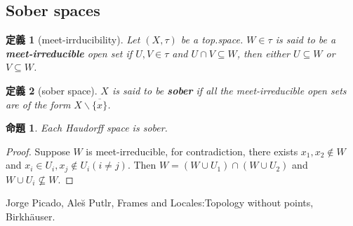 \documentclass[a4j,12pt]{jarticle}
\numberwithin{equation}{section}
\newcommand{\itbf}[1]{\textit{\textbf{#1}}}
\newtheorem{dfn}{定義}[section]
\newtheorem{prop}[thm]{命題}
\begin{document}
\subsection{Sober spaces}
\begin{dfn}[meet-irrducibility]
  Let $(X,\tau)$ be a top.space. $W\in \tau$ is said to be a \itbf{meet-irreducible} open set if $U,V\in \tau$ and $U \cap V \subseteq W$, then either $U \subseteq W$ or $V \subseteq W$.
\end{dfn}
\begin{dfn}[sober space]
  $X$ is said to be \itbf{sober} if all the meet-irreducible open sets are of the form $X\backslash \overline{\{x\}}$.
\end{dfn}
\begin{prop}
  Each Haudorff space is sober.
\end{prop}
\begin{proof}
  Suppose $W$ is meet-irreducible, for contradiction, there exists $x_1,x_2\notin W$ and $x_i \in U_i, x_j \notin U_i(i \ne j)$.
  Then $W = (W \cup U_1) \cap (W \cup U_2)$ and $W\cup U_i \nsubseteq W$.
\end{proof}

\begin{thebibliography}{10}
  Jorge Picado, Ale\u{s} Putlr, Frames and Locales:Topology without points, Birkh\"auser.
\end{thebibliography}
\end{document}
